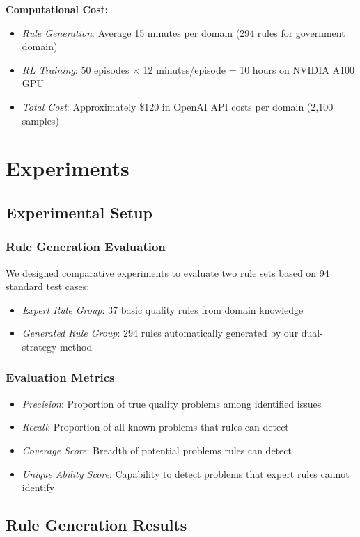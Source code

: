 \documentclass[runningheads]{llncs}
\begin{document}
\textbf{Computational Cost:}
\begin{itemize}
    \item \textit{Rule Generation}: Average 15 minutes per domain (294 rules for government domain)
    \item \textit{RL Training}: 50 episodes × 12 minutes/episode = 10 hours on NVIDIA A100 GPU
    \item \textit{Total Cost}: Approximately \$120 in OpenAI API costs per domain (2,100 samples)
\end{itemize}

\section{Experiments}
% 
\subsection{Experimental Setup}

\subsubsection{Rule Generation Evaluation}
We designed comparative experiments to evaluate two rule sets based on 94 standard test cases:
\begin{itemize}
    \item \textit{Expert Rule Group}: 37 basic quality rules from domain knowledge
    \item \textit{Generated Rule Group}: 294 rules automatically generated by our dual-strategy method
\end{itemize}

\subsubsection{Evaluation Metrics}
\begin{itemize}
    \item \textit{Precision}: Proportion of true quality problems among identified issues
    \item \textit{Recall}: Proportion of all known problems that rules can detect
    \item \textit{Coverage Score}: Breadth of potential problems rules can detect
    \item \textit{Unique Ability Score}: Capability to detect problems that expert rules cannot identify
\end{itemize}

\subsection{Rule Generation Results}
\end{document}
